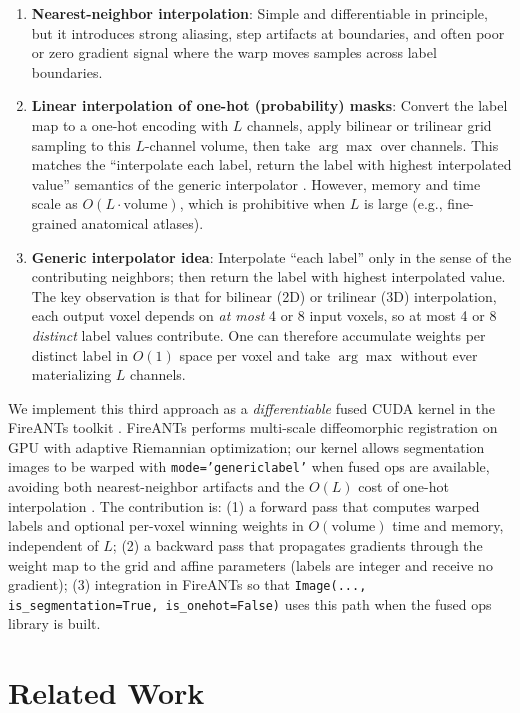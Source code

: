 \documentclass[11pt]{article}
\begin{document}
\begin{enumerate}
\item \textbf{Nearest-neighbor interpolation}: Simple and differentiable in principle, but it introduces strong aliasing, step artifacts at boundaries, and often poor or zero gradient signal where the warp moves samples across label boundaries.
\item \textbf{Linear interpolation of one-hot (probability) masks}: Convert the label map to a one-hot encoding with $L$ channels, apply bilinear or trilinear grid sampling to this $L$-channel volume, then take $\arg\max$ over channels. This matches the ``interpolate each label, return the label with highest interpolated value'' semantics of the generic interpolator \cite{schaerer2014generic}. However, memory and time scale as $O(L \cdot \text{volume})$, which is prohibitive when $L$ is large (e.g., fine-grained anatomical atlases).
\item \textbf{Generic interpolator idea}: Interpolate ``each label'' only in the sense of the contributing neighbors; then return the label with highest interpolated value. The key observation is that for bilinear (2D) or trilinear (3D) interpolation, each output voxel depends on \emph{at most} 4 or 8 input voxels, so at most 4 or 8 \emph{distinct} label values contribute. One can therefore accumulate weights per distinct label in $O(1)$ space per voxel and take $\arg\max$ without ever materializing $L$ channels.
\end{enumerate}

We implement this third approach as a \emph{differentiable} fused CUDA kernel in the FireANTs toolkit \cite{jena2024fireants}. FireANTs performs multi-scale diffeomorphic registration on GPU with adaptive Riemannian optimization; our kernel allows segmentation images to be warped with \texttt{mode='genericlabel'} when fused ops are available, avoiding both nearest-neighbor artifacts and the $O(L)$ cost of one-hot interpolation \cite{jena2024fireants}. The contribution is: (1) a forward pass that computes warped labels and optional per-voxel winning weights in $O(\text{volume})$ time and memory, independent of $L$; (2) a backward pass that propagates gradients through the weight map to the grid and affine parameters (labels are integer and receive no gradient); (3) integration in FireANTs so that \texttt{Image(..., is\_segmentation=True, is\_onehot=False)} uses this path when the fused ops library is built.

\section{Related Work}
\label{sec:related}
\end{document}
